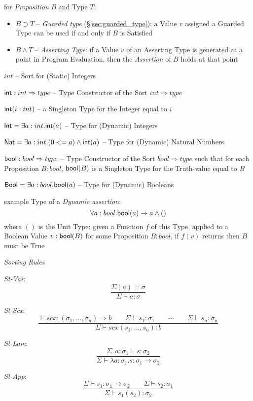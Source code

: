 for \emph{Proposition} $B$ and Type $T$:
\begin{itemize}
\item $B \supset T$ -- \emph{Guarded type}
  (\S\ref{sec:guarded_type}): a Value $v$ assigned a Guarded Type can
  be used if and only if $B$ is Satisfied
\item $B \wedge T$ -- \emph{Asserting Type}: if a Value $v$ of an
  Asserting Type is generated at a point in Program Evaluation, then
  the \emph{Assertion} of $B$ holds at that point
\end{itemize}

$int$ -- Sort for (Static) Integers

$\mathsf{int} : int \Rightarrow type$ -- Type Constructor of the Sort $int
\Rightarrow type$

$\mathsf{int}(i:int)$ -- a Singleton Type for the Integer equal to $i$

$\mathsf{Int} = \exists a:int.\mathsf{int}(a)$ -- Type for (Dynamic) Integers

$\mathsf{Nat} = \exists a:int.(0 <= a) \wedge \mathsf{int}(a)$ -- Type for (Dynamic)
Natural Numbers

$\mathsf{bool} : bool \Rightarrow type$ -- Type Constructor of the Sort $bool
\Rightarrow type$ such that for each Proposition $B:bool$, $\mathsf{bool}(B)$
is a Singleton Type for the Truth-value equal to $B$

$\mathsf{Bool} = \exists a:bool.\mathsf{bool}(a)$ -- Type for (Dynamic) Booleans

example Type of a \emph{Dynamic assertion}:
\[
  \forall a:bool.\mathsf{bool}(a) \rightarrow a \wedge ()
\]
where $()$ is the Unit Type: given a Function $f$ of this Type,
applied to a Boolean Value $v:\mathsf{bool}(B)$ for some Proposition $B:bool$,
if $f(v)$ returns then $B$ must be True


\emph{Sorting Rules}

\emph{St-Var}:
\[
  \frac{\Sigma(a) = \sigma}{\Sigma \vdash a:\sigma}
\]

\emph{St-Scx}:
\[
  \frac{\vdash scx:(\sigma_1,...,\sigma_n) \Rightarrow b \quad\quad
    \Sigma \vdash s_1:\sigma_1 \quad\quad \cdots \quad\quad
    \Sigma \vdash s_n:\sigma_n}
  {\Sigma \vdash scx(s_1,...,s_n):b}
\]

\emph{St-Lam}:
\[
  \frac{\Sigma, a:\sigma_1 \vdash s:\sigma_2}
    {\Sigma \vdash \lambda a:\sigma_1.s:\sigma_1 \rightarrow \sigma_2}
\]

\emph{St-App}:
\[
  \frac{\Sigma \vdash s_1:\sigma_1 \rightarrow \sigma_2 \quad\quad
    \Sigma \vdash s_2:\sigma_1}
  {\Sigma \vdash s_1(s_2):\sigma_2 }
\]

